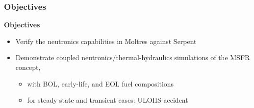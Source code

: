 \begin{frame}
	\frametitle{Objectives}
		\textbf{Objectives}
		\begin{itemize}
			\item Verify the neutronics capabilities in Moltres against Serpent
			\cite{leppanen_serpent_2015}
			\item Demonstrate coupled neutronics/thermal-hydraulics simulations
			of the \gls{MSFR} concept,
			\begin{itemize}
				\item with \gls{BOL}, early-life, and \gls{EOL} fuel compositions
				\item for steady state and transient cases: \gls{ULOHS} accident
			\end{itemize}
		\end{itemize}
\end{frame}